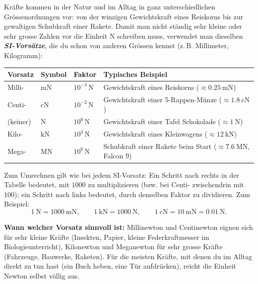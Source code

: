 \documentclass[addpoints,11pt,a4paper]{exam}
\begin{document}
\begin{theoriebox}
Kräfte kommen in der Natur und im Alltag in ganz unterschiedlichen
Grössenordnungen vor: von der winzigen Gewichtskraft eines Reiskorns bis
zur gewaltigen Schubkraft einer Rakete. Damit man nicht ständig sehr
kleine oder sehr grosse Zahlen vor die Einheit $\si{\newton}$ schreiben
muss, verwendet man dieselben \textbf{\emph{SI-Vorsätze}}, die du schon
von anderen Grössen kennst (z.\,B. Millimeter, Kilogramm):

\begin{center}
\begin{tabular}{@{}lllp{5.3cm}@{}}
\toprule
\textbf{Vorsatz} & \textbf{Symbol} & \textbf{Faktor} & \textbf{Typisches Beispiel} \\
\midrule
Milli- & $\si{\milli\newton}$ & $10^{-3}\,\si{\newton}$ & Gewichtskraft eines Reiskorns ($\approx\SI{0.25}{\milli\newton}$) \\
Centi- & $\si{\centi\newton}$ & $10^{-2}\,\si{\newton}$ & Gewichtskraft einer 5-Rappen-Münze ($\approx\SI{1.8}{\centi\newton}$) \\
(keiner) & $\si{\newton}$ & $10^{0}\,\si{\newton}$ & Gewichtskraft einer Tafel Schokolade ($\approx\SI{1}{\newton}$) \\
Kilo- & $\si{\kilo\newton}$ & $10^{3}\,\si{\newton}$ & Gewichtskraft eines Kleinwagens ($\approx\SI{12}{\kilo\newton}$) \\
Mega- & $\si{\mega\newton}$ & $10^{6}\,\si{\newton}$ & Schubkraft einer Rakete beim Start ($\approx\SI{7.6}{\mega\newton}$, Falcon 9) \\
\bottomrule
\end{tabular}
\end{center}

Zum Umrechnen gilt wie bei jedem SI-Vorsatz: Ein Schritt nach rechts in
der Tabelle bedeutet, mit $1000$ zu multiplizieren (bzw. bei Centi-
zwischendrin mit $100$); ein Schritt nach links bedeutet, durch denselben
Faktor zu dividieren. Zum Beispiel:
\[
  \SI{1}{\newton} = \SI{1000}{\milli\newton}, \qquad
  \SI{1}{\kilo\newton} = \SI{1000}{\newton}, \qquad
  \SI{1}{\centi\newton} = \SI{10}{\milli\newton} = \SI{0.01}{\newton}.
\]

\textbf{Wann welcher Vorsatz sinnvoll ist:} Millinewton und Centinewton
eignen sich für sehr kleine Kräfte (Insekten, Papier, kleine
Federkraftmesser im Biologieunterricht), Kilonewton und Meganewton für
sehr grosse Kräfte (Fahrzeuge, Bauwerke, Raketen). Für die meisten Kräfte, mit
denen du im Alltag direkt zu tun hast (ein Buch heben, eine Tür
aufdrücken), reicht die Einheit Newton selbst völlig aus.
\end{theoriebox}
\end{document}
